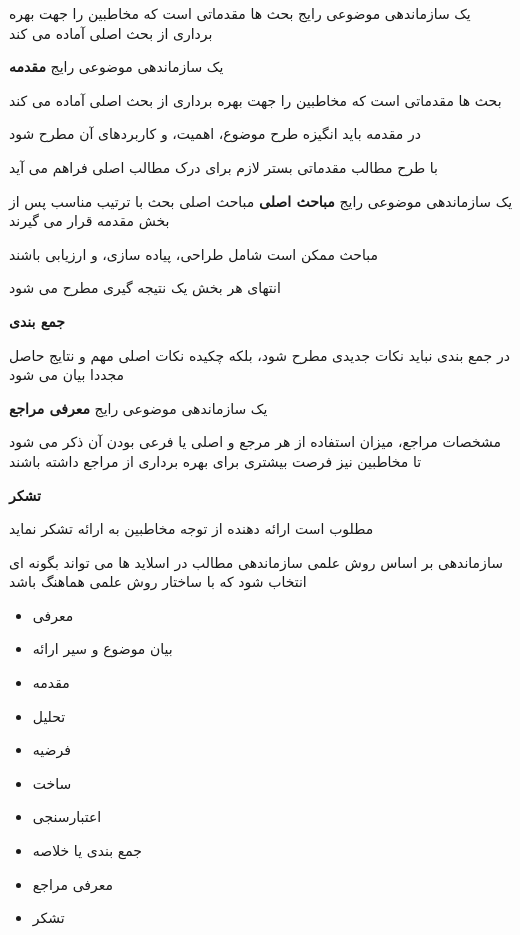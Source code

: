\documentclass[14pt]{beamer}
\makeatletter
\newcommand{\rtlist}{\raggedleft\rightskip\@totalleftmargin}
\newcommand{\framefontsizelarge}{\fontsize{18pt}{0pt}\selectfont}
\newcommand{\frametitlefontsize}{\fontsize{20pt}{0pt}\selectfont}
\makeatother
\begin{document}
\begin{persian}
\begin{frame}[plain]{\frametitlefontsize یک سازماندهی موضوعی رایج}
		بحث ها مقدماتی است که مخاطبین را جهت بهره برداری از بحث اصلی آماده می
		کند
	\end{frame}		

	\begin{frame}[plain]{\frametitlefontsize یک سازماندهی موضوعی رایج}
		\framefontsizelarge
		\textbf{مقدمه}
		
		بحث ها مقدماتی است که مخاطبین را جهت بهره برداری از بحث اصلی آماده می کند
		
		در مقدمه باید انگیزه طرح موضوع، اهمیت، و کاربردهای آن مطرح شود
		
		با طرح مطالب مقدماتی بستر لازم برای درک مطالب اصلی فراهم می آید
	\end{frame}	
	
	\begin{frame}[plain]{\frametitlefontsize یک سازماندهی موضوعی رایج}
		\framefontsizelarge
		\textbf{مباحث اصلی}
		مباحث اصلی بحث با ترتیب مناسب پس از بخش مقدمه قرار می گیرند
		
		مباحث ممکن است شامل طراحی، پیاده سازی، و ارزیابی باشند
		
		انتهای هر بخش یک نتیجه گیری مطرح می شود
		
		\textbf{جمع بندی}
		
		در جمع بندی نباید نکات جدیدی مطرح شود، بلکه چکیده نکات اصلی مهم و نتایج حاصل مجددا بیان می شود
	\end{frame}	
	
	\begin{frame}[plain]{\frametitlefontsize یک سازماندهی موضوعی رایج}
		\framefontsizelarge
		\textbf{معرفی مراجع}
		
		مشخصات مراجع، میزان استفاده از هر مرجع و اصلی یا فرعی بودن آن ذکر می شود تا مخاطبین نیز فرصت بیشتری برای بهره برداری از مراجع داشته باشند
		
		\textbf{تشکر}
		
		مطلوب است ارائه دهنده از توجه مخاطبین به ارائه تشکر نماید
	\end{frame}	
	
	\begin{frame}[plain]{\frametitlefontsize سازماندهی بر اساس روش علمی}
		\framefontsizelarge
		سازماندهی مطالب در اسلاید ها می تواند بگونه ای انتخاب شود که با ساختار روش علمی هماهنگ باشد
		
		\begin{itemize}\rtlist
			\item معرفی
			\item بیان موضوع و سیر ارائه
			\item مقدمه
			\item تحلیل
			\item فرضیه
			\item ساخت
			\item اعتبارسنجی
			\item جمع بندی یا خلاصه
			\item معرفی مراجع
			\item تشکر
		\end{itemize}
	\end{frame}	

\end{persian}
\end{document}
